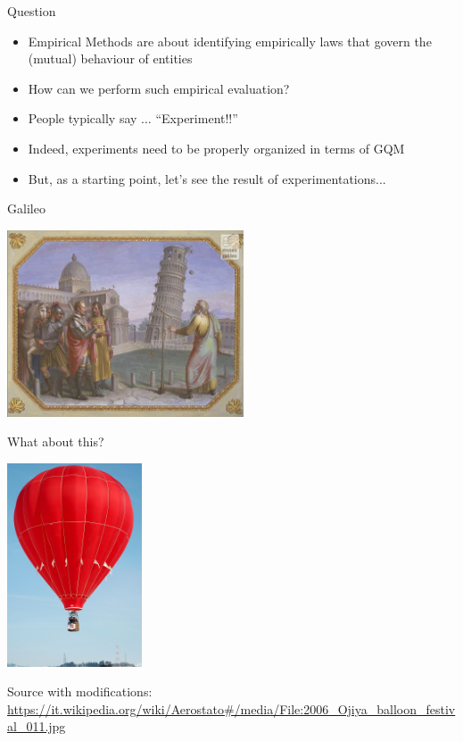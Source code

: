 \documentclass{beamer}
\begin{document}
\begin{frame}
{\centerline{Question}}

\begin{itemize}
\item Empirical Methods are about identifying empirically laws that govern the (mutual) behaviour of entities
\item How can we perform such empirical evaluation?
\item People typically say $\ldots$ ``Experiment!!''
\item Indeed, experiments need to be properly organized in terms of GQM
\item But, as a starting point, let's see the result of experimentations...
\end{itemize}


\end{frame}

\begin{frame}
{\centerline{Galileo}}

\begin{center}
\includegraphics[width=7cm]{A2022.IDSEPC.SperimentazioneDeduzione/Galileo.png}
\end{center} 

\end{frame}


\begin{frame}
{\centerline{What about this?}}

\begin{center}
\includegraphics[width=4cm]{A2022.IDSEPC.SperimentazioneDeduzione/Mongolfiera.jpg}
\end{center} 

\begin{center}
\tiny
Source with modifications:\\
\url{https://it.wikipedia.org/wiki/Aerostato\#/media/File:2006_Ojiya_balloon_festival_011.jpg}
\end{center} 

\end{frame}
\end{document}
